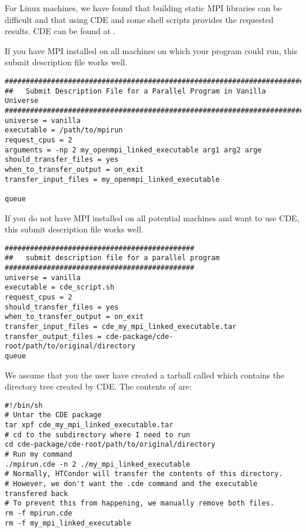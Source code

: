 For Linux machines, we have found that building static MPI libraries can be 
difficult and that 
using CDE and some shell scripts provides the requested results. CDE can be
found at .

If you have MPI installed on all machines on which your program could run, this
submit description file works well.
\begin{verbatim}
################################################################################
##   Submit Description File for a Parallel Program in Vanilla Universe
################################################################################
universe = vanilla
executable = /path/to/mpirun
request_cpus = 2
arguments = -np 2 my_openmpi_linked_executable arg1 arg2 arge
should_transfer_files = yes
when_to_transfer_output = on_exit
transfer_input_files = my_openmpi_linked_executable

queue
\end{verbatim}

If you do not have MPI installed on all potential machines and want to use CDE,
this submit description file works well.
\begin{verbatim}
#############################################
##   submit description file for a parallel program
#############################################
universe = vanilla
executable = cde_script.sh
request_cpus = 2
should_transfer_files = yes
when_to_transfer_output = on_exit
transfer_input_files = cde_my_mpi_linked_executable.tar
transfer_output_files = cde-package/cde-root/path/to/original/directory
queue
\end{verbatim}

We assume that you the user have created a tarball called 
 which contains the directory tree
created by CDE.
The contents of  are:
\begin{verbatim}
#!/bin/sh
# Untar the CDE package
tar xpf cde_my_mpi_linked_executable.tar
# cd to the subdirectory where I need to run
cd cde-package/cde-root/path/to/original/directory
# Run my command
./mpirun.cde -n 2 ./my_mpi_linked_executable
# Normally, HTCondor will transfer the contents of this directory.
# However, we don't want the .cde command and the executable transfered back
# To prevent this from happening, we manually remove both files.
rm -f mpirun.cde
rm -f my_mpi_linked_executable
\end{verbatim}
